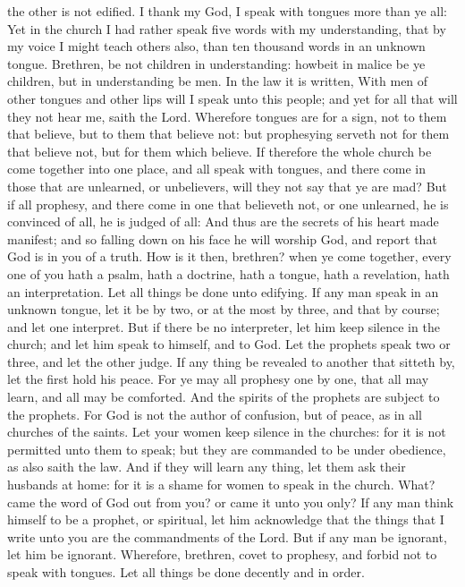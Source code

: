 the other is not edified.  I thank my God, I speak with
tongues more than ye all:  Yet in the church I had rather
speak five words with my understanding, that by my voice I might teach
others also, than ten thousand words in an unknown tongue. 
Brethren, be not children in understanding: howbeit in malice be ye
children, but in understanding be men.  In the law it is
written, With men of other tongues and other lips will I speak unto this
people; and yet for all that will they not hear me, saith the Lord.
 Wherefore tongues are for a sign, not to them that
believe, but to them that believe not: but prophesying serveth not for
them that believe not, but for them which believe.  If
therefore the whole church be come together into one place, and all
speak with tongues, and there come in those that are unlearned, or
unbelievers, will they not say that ye are mad?  But if all
prophesy, and there come in one that believeth not, or one unlearned, he
is convinced of all, he is judged of all:  And thus are the
secrets of his heart made manifest; and so falling down on his face he
will worship God, and report that God is in you of a truth.
 How is it then, brethren? when ye come together, every one
of you hath a psalm, hath a doctrine, hath a tongue, hath a revelation,
hath an interpretation. Let all things be done unto edifying.
 If any man speak in an unknown tongue, let it be by two,
or at the most by three, and that by course; and let one interpret.
 But if there be no interpreter, let him keep silence in
the church; and let him speak to himself, and to God.  Let
the prophets speak two or three, and let the other judge. 
If any thing be revealed to another that sitteth by, let the first hold
his peace.  For ye may all prophesy one by one, that all
may learn, and all may be comforted.  And the spirits of
the prophets are subject to the prophets.  For God is not
the author of confusion, but of peace, as in all churches of the saints.
 Let your women keep silence in the churches: for it is not
permitted unto them to speak; but they are commanded to be under
obedience, as also saith the law.  And if they will learn
any thing, let them ask their husbands at home: for it is a shame for
women to speak in the church.  What? came the word of God
out from you? or came it unto you only?  If any man think
himself to be a prophet, or spiritual, let him acknowledge that the
things that I write unto you are the commandments of the Lord.
 But if any man be ignorant, let him be ignorant.
 Wherefore, brethren, covet to prophesy, and forbid not to
speak with tongues.  Let all things be done decently and in
order.

